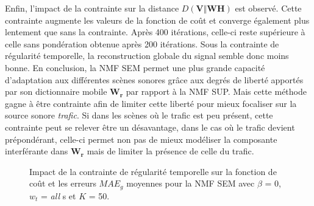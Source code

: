 Enfin, l'impact de la contrainte sur la distance $D(\mathbf{V}\Vert \mathbf{WH})$ est observé. Cette contrainte augmente les valeurs de la fonction de coût et converge également plus lentement que sans la contrainte. Après 400 itérations, celle-ci reste supérieure à celle sans pondération obtenue après 200 itérations. Sous la contrainte de régularité temporelle, la reconstruction globale du signal semble donc moins bonne. 
En conclusion, la NMF SEM permet une plus grande capacité d'adaptation aux différentes scènes sonores grâce aux degrés de liberté apportés par son dictionnaire mobile $\mathbf{W_r}$ par rapport à la NMF SUP. Mais cette méthode gagne à être contrainte afin de limiter cette liberté pour mieux focaliser sur la source sonore \textit{trafic}. Si dans les scènes où le trafic est peu présent, cette contrainte peut se relever être un désavantage, dans le cas où le trafic devient prépondérant, celle-ci permet non pas de mieux modéliser la composante interférante dans $\mathbf{W_r}$ mais de limiter la présence de celle du trafic.

\begin{figure}[h!]
\centering
{}%
\qquad
{}%
\caption{Impact de la contrainte de régularité temporelle sur la fonction de coût et les erreurs $MAE_g$ moyennes pour la NMF SEM avec $\beta$ = 0, $w_t$ = \textit{all} s et $K$ = 50.}
\label{fig:evolution_mae_sm}
\end{figure}


